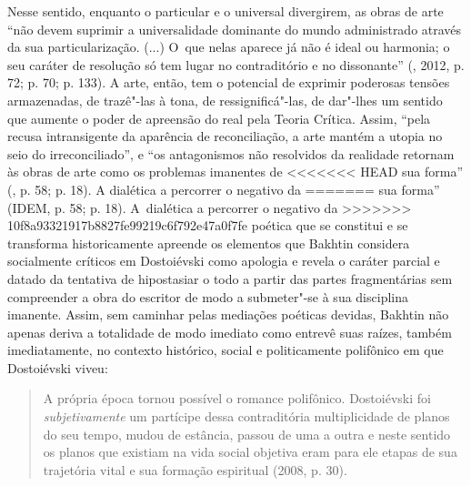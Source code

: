 {{Nesse sentido, enquanto o particular e o universal divergirem, as obras
de arte ``não devem suprimir a universalidade dominante do mundo
administrado através da sua particularização. (...) O~que nelas aparece
já não é ideal ou harmonia; o seu caráter de resolução só tem lugar no
contraditório e no dissonante'' (, 2012, p. 72; p. 70; p. 133). A
arte, então, tem o potencial de exprimir poderosas tensões armazenadas,
de trazê"-las à tona, de ressignificá"-las, de dar"-lhes um sentido que
aumente o poder de apreensão do real pela Teoria Crítica. Assim, ``pela
recusa intransigente da aparência de reconciliação, a arte mantém a
utopia no seio do irreconciliado'', e ``os antagonismos não resolvidos
da realidade retornam às obras de arte como os problemas imanentes de
<<<<<<< HEAD
sua forma'' (, p. 58; p. 18). A dialética a percorrer o negativo da
=======
sua forma'' (IDEM, p. 58; p. 18). A~dialética a percorrer o negativo da
>>>>>>> 10f8a93321917b8827fe99219c6f792e47a0f7fe
poética que se constitui e se transforma historicamente apreende os
elementos que Bakhtin considera socialmente críticos em Dostoiévski como
apologia e revela o caráter parcial e datado da tentativa de hipostasiar
o todo a partir das partes fragmentárias sem compreender a obra do
escritor de modo a submeter"-se à sua disciplina imanente. Assim, sem
caminhar pelas mediações poéticas devidas, Bakhtin não apenas deriva a
totalidade de modo imediato como entrevê suas raízes, também
imediatamente, no contexto histórico, social e politicamente polifônico
em que Dostoiévski viveu:

\begin{quote}
A própria época tornou possível o romance polifônico. Dostoiévski foi
\emph{subjetivamente} um partícipe dessa contraditória multiplicidade de
planos do seu tempo, mudou de estância, passou de uma a outra e neste
sentido os planos que existiam na vida social objetiva eram para ele
etapas de sua trajetória vital e sua formação espiritual (2008, p. 30).
\end{quote}

}}
